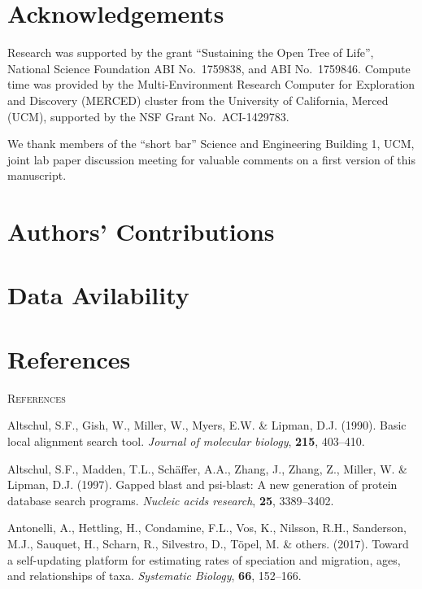\documentclass[]{article}
\begin{document}
\hypertarget{acknowledgements}{%
\section{Acknowledgements}\label{acknowledgements}}

Research was supported by the grant ``Sustaining the Open Tree of Life'', National Science Foundation ABI No.~1759838, and ABI No.~1759846.
Compute time was provided by the Multi-Environment Research Computer for Exploration and Discovery (MERCED) cluster from the University of California, Merced (UCM), supported by the NSF Grant No.~ACI-1429783.

We thank members of the ``short bar'' Science and Engineering Building 1, UCM, joint lab paper discussion meeting for valuable comments on a first version of this manuscript.

\hypertarget{authors-contributions}{%
\section{Authors' Contributions}\label{authors-contributions}}

\hypertarget{data-avilability}{%
\section{Data Avilability}\label{data-avilability}}

\newpage

\hypertarget{references}{%
\section{References}\label{references}}

\newpage
\begin{center}
\textsc{References}
\end{center}

\hypertarget{refs}{}
\leavevmode\hypertarget{ref-altschul1990basic}{}%
Altschul, S.F., Gish, W., Miller, W., Myers, E.W. \& Lipman, D.J. (1990). Basic local alignment search tool. \emph{Journal of molecular biology}, \textbf{215}, 403--410.

\leavevmode\hypertarget{ref-altschul1997gapped}{}%
Altschul, S.F., Madden, T.L., Schäffer, A.A., Zhang, J., Zhang, Z., Miller, W. \& Lipman, D.J. (1997). Gapped blast and psi-blast: A new generation of protein database search programs. \emph{Nucleic acids research}, \textbf{25}, 3389--3402.

\leavevmode\hypertarget{ref-antonelli2017toward}{}%
Antonelli, A., Hettling, H., Condamine, F.L., Vos, K., Nilsson, R.H., Sanderson, M.J., Sauquet, H., Scharn, R., Silvestro, D., Töpel, M. \& others. (2017). Toward a self-updating platform for estimating rates of speciation and migration, ages, and relationships of taxa. \emph{Systematic Biology}, \textbf{66}, 152--166.
\end{document}
